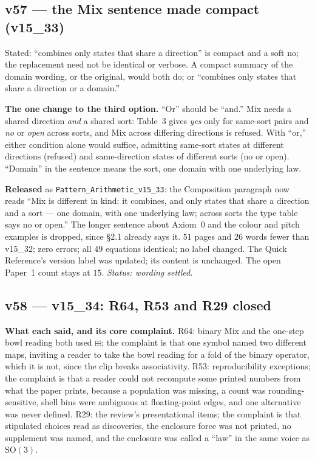 \documentclass[11pt]{article}
\begin{document}
\subsection*{v57 --- the Mix sentence made compact (v15\_33)}
Stated: ``combines only states that share a direction'' is compact and a soft no; the replacement need not be identical or verbose. A compact summary of the domain wording, or the original, would both do; or ``combines only states that share a direction or a domain.''

\textbf{The one change to the third option.} ``Or'' should be ``and.'' Mix needs a shared direction \emph{and} a shared sort: Table~3 gives \emph{yes} only for same-sort pairs and \emph{no} or \emph{open} across sorts, and Mix across differing directions is refused. With ``or,'' either condition alone would suffice, admitting same-sort states at different directions (refused) and same-direction states of different sorts (no or open). ``Domain'' in the sentence means the sort, one domain with one underlying law.

\textbf{Released} as \texttt{Pattern\_Arithmetic\_v15\_33}: the Composition paragraph now reads ``Mix is different in kind: it combines, and only states that share a direction and a sort --- one domain, with one underlying law; across sorts the type table says no or open.'' The longer sentence about Axiom~0 and the colour and pitch examples is dropped, since \S2.1 already says it.
$51$ pages and $26$ words fewer than v15\_32; zero errors; all $49$ equations identical; no label changed. The Quick Reference's version label was updated; its content is unchanged. The open Paper~1 count stays at $15$.
\emph{Status: wording settled.}


\subsection*{v58 --- v15\_34: R64, R53 and R29 closed}
\textbf{What each said, and its core complaint.}
R64: binary Mix and the one-step bowl reading both used $\boxplus$; the complaint is that one symbol named two different maps, inviting a reader to take the bowl reading for a fold of the binary operator, which it is not, since the clip breaks associativity.
R53: reproducibility exceptions; the complaint is that a reader could not recompute some printed numbers from what the paper prints, because a population was missing, a count was rounding-sensitive, shell bins were ambiguous at floating-point edges, and one alternative was never defined.
R29: the review's presentational items; the complaint is that stipulated choices read as discoveries, the enclosure force was not printed, no supplement was named, and the enclosure was called a ``law'' in the same voice as $\mathrm{SO}(3)$.
\end{document}
